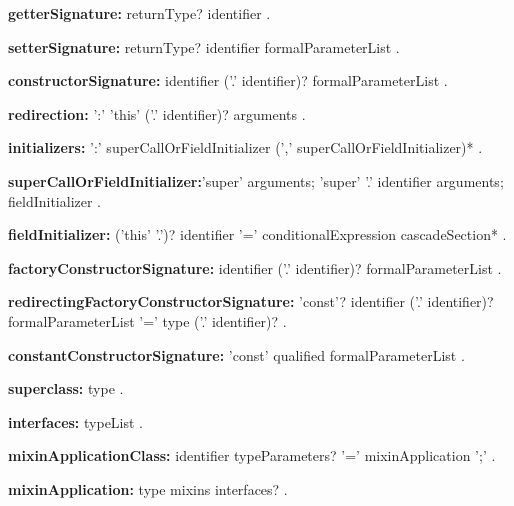\begin{grammar}
{\bf getterSignature:}
       returnType? \GET{} identifier 
.
\end{grammar}
\begin{grammar}
{\bf setterSignature:}
       returnType? \SET{} identifier formalParameterList
.
\end{grammar}
\begin{grammar}
{\bf constructorSignature:}
      identifier ('.' identifier)? formalParameterList
    .
 \end{grammar}
\begin{grammar}
{\bf redirection:}
     ':' 'this' ('.' identifier)? arguments
    .
\end{grammar}
\begin{grammar}
{\bf initializers:}
      ':' superCallOrFieldInitializer (',' superCallOrFieldInitializer)*
    .


{\bf superCallOrFieldInitializer:}'super' arguments;
      'super' '.' identifier arguments;
     fieldInitializer
    .
    
   {\bf  fieldInitializer:}
      ('this' '.')? identifier '=' conditionalExpression cascadeSection*
    .

\end{grammar}
\begin{grammar}
{\bf factoryConstructorSignature:}
      \FACTORY{} identifier  ('.' identifier)?  formalParameterList
    .
\end{grammar}
\begin{grammar}
{\bf redirectingFactoryConstructorSignature:}
      'const'? \FACTORY{} identifier ('.' identifier)? formalParameterList '=' type ('.' identifier)?
    .
\end{grammar}
\begin{grammar}
{\bf constantConstructorSignature:}
      'const' qualified formalParameterList
    .
\end{grammar}
\begin{grammar}
{\bf superclass:}
      \EXTENDS{} type
    .
\end{grammar}
\begin{grammar}
{\bf interfaces:}
      \IMPLEMENTS{} typeList
    .
\end{grammar}
\begin{grammar}
{\bf  mixinApplicationClass:}
  identifier typeParameters? '='  mixinApplication ';' .
  
{\bf mixinApplication:}
     type mixins interfaces? 
    .
\end{grammar}
